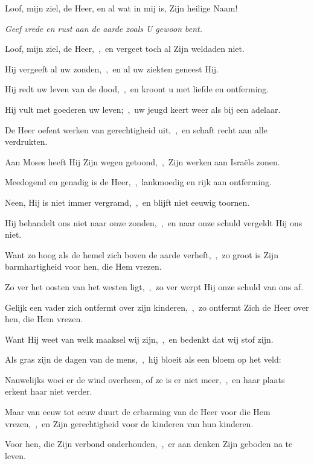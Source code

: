 \documentclass[12pt,twoside,a5paper]{article}
\begin{document}


\begin{halfparskip}
  Loof, mijn ziel, de Heer, en al wat in mij is, Zijn heilige Naam!


   \emph{Geef vrede en rust aan de aarde zoals U gewoon bent.}

  Loof, mijn ziel, de Heer,~\sep\ en vergeet toch al Zijn weldaden niet.

  Hij vergeeft al uw zonden,~\sep\ en al uw ziekten geneest Hij.

  Hij redt uw leven van de dood,~\sep\ en kroont u met liefde en ontferming.

  Hij vult met goederen uw leven;~\sep\ uw jeugd keert weer als bij een adelaar.
\end{halfparskip}


\begin{halfparskip}
  De Heer oefent werken van gerechtigheid uit,~\sep\ en schaft recht aan alle verdrukten.

  Aan Moses heeft Hij Zijn wegen getoond,~\sep\ Zijn werken aan Israëls zonen.

  Meedogend en genadig is de Heer,~\sep\ lankmoedig en rijk aan ontferming.

  Neen, Hij is niet immer vergramd,~\sep\ en blijft niet eeuwig toornen.

  Hij behandelt ons niet naar onze zonden,~\sep\ en naar onze schuld vergeldt Hij ons niet.
\end{halfparskip}


\begin{halfparskip}
  Want zo hoog als de hemel zich boven de aarde verheft,~\sep\ zo groot is Zijn barmhartigheid voor hen, die Hem vrezen.

  Zo ver het oosten van het westen ligt,~\sep\ zo ver werpt Hij onze schuld van ons af.

  Gelijk een vader zich ontfermt over zijn kinderen,~\sep\ zo ontfermt Zich de Heer over hen, die Hem vrezen.

  Want Hij weet van welk maaksel wij zijn,~\sep\ en bedenkt dat wij stof zijn.

  Als gras zijn de dagen van de mens,~\sep\ hij bloeit als een bloem op het veld:

  Nauwelijks woei er de wind overheen, of ze is er niet meer,~\sep\ en haar plaats erkent haar niet verder.

  Maar van eeuw tot eeuw duurt de erbarming van de Heer voor die Hem vrezen,~\sep\ en Zijn gerechtigheid voor de kinderen van hun kinderen.

  Voor hen, die Zijn verbond onderhouden,~\sep\ er aan denken Zijn geboden na te leven.
\end{halfparskip}
\end{document}
